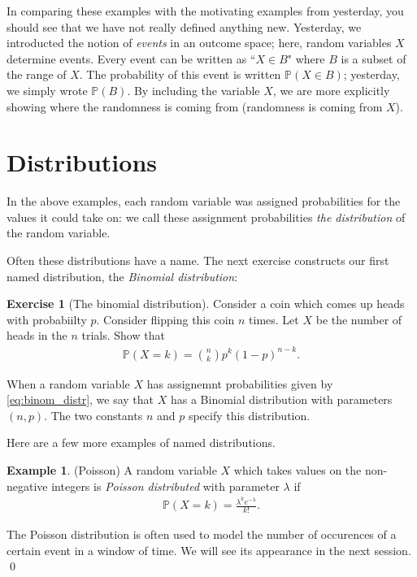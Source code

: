 \documentclass[11pt]{article}
\theoremstyle{definition}
\newtheorem{example}[theorem]{Example}
\newtheorem{exercise}[]{Exercise}
\renewcommand{\P}{\mathbb{P}}
\begin{document}
In comparing these examples with the motivating
examples from yesterday, you should see that
we have not really defined anything new.
Yesterday, we introducted the notion of \textit{events}
in an outcome space; here, random variables $X$
determine events.
Every event can be written as ``$X\in B$" where
$B$ is a subset of the range of $X$.
The probability of this event is written
$\P(X\in B)$; yesterday, we simply wrote $\P(B)$.
By including the variable $X$, we are more
explicitly showing where the randomness is coming from
(randomness is coming from $X$).

\section{Distributions}

In the above examples, each random variable was assigned probabilities for
the values it could take on: we call these assignment probabilities
\textit{the distribution} of the random variable.

Often these distributions have a name. The next exercise constructs our
first named distribution, the \textit{Binomial distribution}:

\begin{exercise}[The binomial distribution]
Consider a coin which comes up heads with probabiilty $p$.
Consider flipping this coin $n$ times. Let $X$ be the number of
heads in the $n$ trials. Show that
\begin{align}
\P(X = k) = {n \choose k} p^k (1 - p)^{n - k}.
\label{eq:binom_distr}
\end{align}

\end{exercise}

When a random variable $X$ has assignemnt probabilities given by \eqref{eq:binom_distr},
we say that $X$ has a Binomial distribution with parameters $(n, p)$. The two constants
$n$ and $p$ specify this distribution.

Here are a few more examples of named distributions.

\begin{example}(Poisson)
A random variable $X$ which takes values on the non-negative integers is
\textit{Poisson distributed} with parameter $\lambda$ if
\begin{align*}
  \P(X = k) = \frac{\lambda^k e^{-\lambda}}{k!}.
\end{align*}

The Poisson distribution is often used to model the number of occurences
of a certain event in a window of time. We will see its appearance in the next session.
\qed
\end{example}
\end{document}
